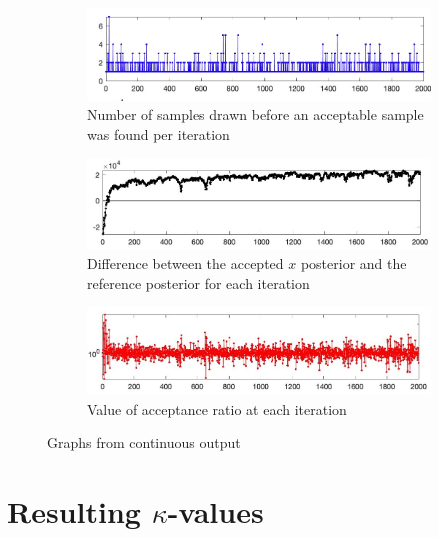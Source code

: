 \begin{figure}[H]
	\centering
	
	\begin{subfigure}[b]{\textwidth}
	\centering	
	\includegraphics[width = \textwidth]{figures/figure10a.jpg}
	\caption{Number of samples drawn before an acceptable sample was found per iteration}
	\label{fig:10a}
	\end{subfigure}{}
	
	\begin{subfigure}[b]{\textwidth}
	\centering	
	\includegraphics[width = \textwidth]{figures/figure10b.jpg}
	\caption{Difference between the accepted $x$ posterior and the reference posterior for each iteration}
	\label{fig:10b}
	\end{subfigure}{}
	
	\begin{subfigure}[b]{\textwidth}
	\centering	
	\includegraphics[width = \textwidth]{figures/figure10c.jpg}
	\caption{Value of acceptance ratio at each iteration}
	\label{fig:10c}
	\end{subfigure}{}
	
	\caption{Graphs from continuous output}
	\label{fig:10}
\end{figure}



\section{Resulting \texorpdfstring{$\kappa$}{TEXT}-values}

